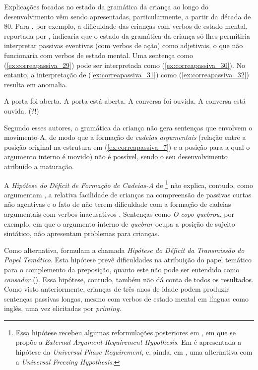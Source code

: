 \documentclass[output=paper]{LSP/langsci}
\begin{document}
Explicações focadas no estado da gramática da criança ao longo do desenvolvimento vêm sendo apresentadas, particularmente, a partir da década de 80. Para \citet{borerwexler1987}, por exemplo, a dificuldade das crianças com verbos de estado mental, reportada por \citet{maratsos_etal1985}, indicaria que o estado da gramática da criança só lhes permitiria interpretar passivas eventivas (com verbos de ação) como adjetivais, o que não funcionaria com verbos de estado mental. Uma sentença como (\ref{ex:correapassiva_29}) pode ser interpretada como (\ref{ex:correapassiva_30}). No entanto, a interpretação de (\ref{ex:correapassiva_31}) como (\ref{ex:correapassiva_32}) resulta em anomalia.

\ea\label{ex:correapassiva_29} A porta foi aberta.\z
\ea\label{ex:correapassiva_30} A porta está aberta.\z
\ea\label{ex:correapassiva_31} A conversa foi ouvida.\z
\ea\label{ex:correapassiva_32} A conversa está ouvida. (?!)\z

Segundo esses autores, a gramática da criança não gera sentenças que envolvem o movimento-A, de modo que a formação de \textit{cadeias argumentais} (relação entre a posição original na estrutura em (\ref{ex:correapassiva_7}) e a posição para a qual o argumento interno é movido) não é possível, sendo o seu desenvolvimento atribuído a maturação.

A \textit{Hipótese do Déficit de Formação de Cadeias-A} de \citeauthor{borerwexler1987}\footnote{Essa hipótese recebeu algumas reformulações posteriores em \citet{babyonyshev_etal2001}, em que se propõe a \textit{External Argument Requirement Hypothesis}. Em \citet{wexler2004} é apresentada a hipótese da \textit{Universal Phase Requirement}, e, ainda, em \citet{hyamssnyder2005}, uma alternativa com a \textit{Universal Freezing Hypothesis}.} não explica, contudo, como argumentam \citet{foxgrodzinsky1998}, a relativa facilidade de crianças na compreensão de passivas curtas não agentivas e o fato de não terem dificuldade com a formação de cadeias argumentais com verbos inacusativos \citep{friedmanncosta2010}. Sentenças como \textit{O copo quebrou}, por exemplo, em que o argumento interno de \textit{quebrar} ocupa a posição de sujeito sintático, não apresentam problemas para crianças. 

Como alternativa, \citet{foxgrodzinsky1998} formulam a chamada \textit{Hipótese do Déficit da Transmissão do Papel Temático}. Esta hipótese prevê dificuldades na atribuição do papel temático para o complemento da preposição, quanto este não pode ser entendido como \textit{causador} (). Essa hipótese, contudo, também não dá conta de todos os resultados. Como visto anteriormente, crianças de três anos de idade podem produzir sentenças passivas longas, mesmo com verbos de estado mental em línguas como inglês, uma vez elicitadas por \textit{priming}.
\end{document}
